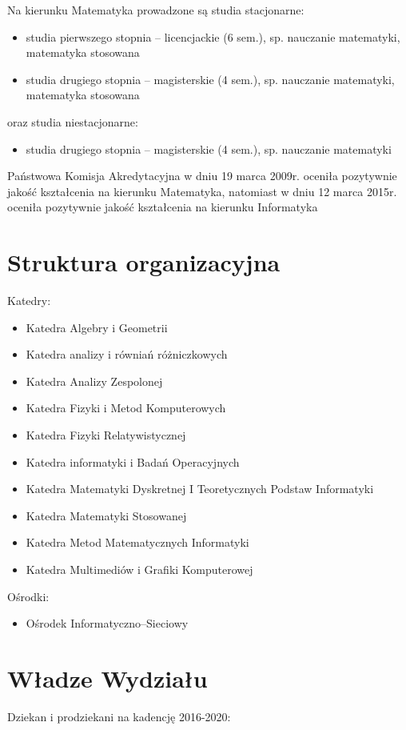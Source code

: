 ﻿\documentclass[a4paper,12pt]{article}
\begin{document}
Na kierunku Matematyka prowadzone są studia stacjonarne:
\begin {itemize}
\item studia pierwszego stopnia – licencjackie (6 sem.), sp. nauczanie matematyki, matematyka stosowana
\item studia drugiego stopnia – magisterskie (4 sem.), sp. nauczanie matematyki, matematyka stosowana\
\end{itemize} 
oraz studia niestacjonarne:
\begin{itemize}
\item studia drugiego stopnia – magisterskie (4 sem.), sp. nauczanie matematyki
\end{itemize}

Państwowa Komisja Akredytacyjna w dniu 19 marca 2009r. oceniła pozytywnie jakość kształcenia na kierunku
Matematyka, natomiast w dniu 12 marca 2015r. oceniła pozytywnie jakość kształcenia na kierunku
Informatyka

\section { Struktura organizacyjna}
Katedry:

\begin{itemize}
\item Katedra Algebry i Geometrii
\item Katedra analizy i równiań różniczkowych
\item Katedra Analizy Zespolonej
\item Katedra Fizyki i Metod Komputerowych
\item Katedra Fizyki Relatywistycznej
\item Katedra informatyki i Badań Operacyjnych
\item Katedra Matematyki Dyskretnej I Teoretycznych Podstaw Informatyki
\item Katedra Matematyki Stosowanej
\item Katedra Metod Matematycznych Informatyki
\item Katedra Multimediów i Grafiki Komputerowej
\end{itemize}
Ośrodki:
\begin{itemize}
\item Ośrodek Informatyczno--Sieciowy
\end{itemize}

\section { Władze Wydziału}
Dziekan i prodziekani na kadencję 2016-2020:
\end{document}
